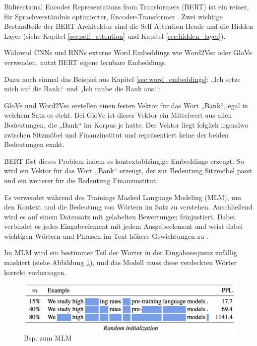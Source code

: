 Bidirectional Encoder Representations from Transformers (BERT) ist ein reiner, für Sprachverständnis optimierter, Encoder-Transformer \cite{devlin2019}.
Zwei wichtige Bestandteile der BERT Architektur sind die Self Attention Heads und die Hidden Layer
(siehe Kapitel \ref{sec:self_attention} und Kapitel \ref{sec:hidden_layer}).

Während CNNs und RNNs externe Word Embeddings wie Word2Vec oder GloVe verwenden, nutzt BERT eigene lernbare Embeddings.

Dazu noch einmal das Beispiel aus Kapitel \ref{sec:word_embeddings}: „Ich setze mich auf die Bank.“ und „Ich raube die Bank aus.“:

GloVe und Word2Vec erstellen einen festen Vektor für das Wort „Bank“, egal in welchem Satz es steht.
Bei GloVe ist dieser Vektor ein Mittelwert aus allen Bedeutungen, die „Bank“ im Korpus je hatte.
Der Vektor liegt folglich irgendwo zwischen Sitzmöbel und Finanzinstitut und repräsentiert keine der beiden Bedeutungen exakt.

BERT löst dieses Problem indem es kontextabhängige Embeddings erzeugt. So wird ein Vektor für das Wort „Bank“ erzeugt, der zur Bedeutung
Sitzmöbel passt und ein weiterer für die Bedeutung Finanzinstitut.

Es verwendet während des Trainings Masked Language Modeling (MLM), um den Kontext und die Bedeutung von Wörtern im Satz zu verstehen.
Anschließend wird es auf einem Datensatz mit gelabelten Bewertungen feinjustiert. 
Dabei verbindet es jedes Eingabeelement mit jedem Ausgabeelement und 
weist dabei wichtigen Wörtern und Phrasen im Text höhere Gewichtungen zu \cite{Deshai:2023aa}.

Im MLM wird ein bestimmer Teil der Wörter in der Eingabesequenz zufällig maskiert (siehe Abbildung \ref{fig:mlm_bert}), 
und das Modell muss diese verdeckten Wörter korrekt vorhersagen.

\begin{figure}[htbp]
    \begin{center}
        \includegraphics[scale=0.5]{static/mlm_bert.png}
        \caption{\label{fig:mlm_bert} Bsp. zum MLM \cite{wettig2023}}
    \end{center}
\end{figure}

